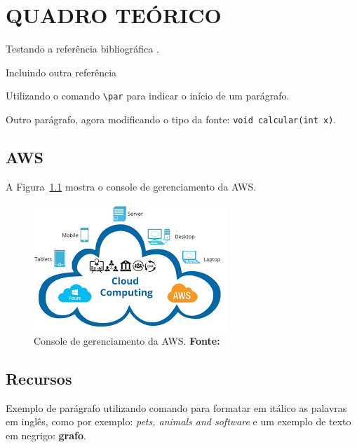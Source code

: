 \chapter{QUADRO TEÓRICO}

\par Testando a referência bibliográfica \cite{ecocentro}.

\par Incluindo outra referência 

\par Utilizando o comando \texttt{\textbackslash par} para indicar o início de um parágrafo.
\par Outro parágrafo, agora modificando o tipo da fonte: \texttt{void calcular(int x)}.

\section{AWS}

\par A Figura~\ref{fig:consoleAWS} mostra o console de gerenciamento da AWS.





\begin{figure}[h!]
  \centerline{\includegraphics[scale=0.8]{./imagens/aws-management-console.png}}
  \caption[Gerenciamento da AWS]
          {Console de gerenciamento da AWS. \textbf{Fonte:} \cite{correa2003plantas}}
\label{fig:consoleAWS}
\end{figure}






\section{Recursos}

\par Exemplo de parágrafo utilizando comando para formatar em itálico as palavras em inglês, como por exemplo: \textit{pets, animals and software} e um exemplo de texto em negrigo: \textbf{grafo}.

